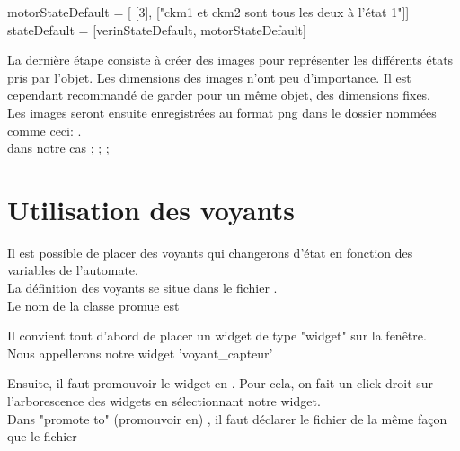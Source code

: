 \begin{Python}
    motorStateDefault = [ [3], ["ckm1 et ckm2 sont tous les deux à l'état 1"]]
    stateDefault = [verinStateDefault, motorStateDefault]
\end{Python}


La dernière étape consiste à créer des images pour représenter les différents états pris par l'objet. Les dimensions des images n'ont peu d'importance. Il est cependant recommandé de garder pour un même objet, des dimensions fixes. \\

Les images seront ensuite enregistrées au format png dans le dossier   nommées comme ceci: .\\

dans notre cas  ;  ;  ; 



\newpage
\section{Utilisation des voyants}

Il est possible de placer des voyants qui changerons d'état en fonction des variables de l'automate. \\
La définition des voyants se situe dans le fichier .\\
Le  nom de la classe promue est 



Il convient tout d'abord de placer un widget de type "widget" sur la fenêtre. \\
Nous appellerons notre widget 'voyant\_capteur' \\




Ensuite, il faut promouvoir le widget en .
Pour cela, on fait un click-droit sur l'arborescence des widgets en sélectionnant notre widget. \\
Dans "promote to" (promouvoir en) , il faut déclarer le fichier  de la même façon que le fichier 



